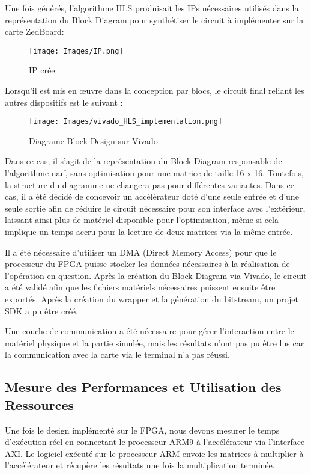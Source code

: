 \documentclass[../CSC_5RO06_TA.tex]{subfiles}
\begin{document}
Une fois générés, l'algorithme HLS produisait les IPs nécessaires utilisés dans la représentation du Block Diagram pour synthétiser le circuit à implémenter sur la carte ZedBoard:

\begin{figure}[H]
    \centering
    \texttt{[image: Images/IP.png]}
    \caption{IP crée}
\end{figure}

Lorsqu'il est mis en œuvre dans la conception par blocs, le circuit final reliant les autres dispositifs est le suivant :


\begin{figure}[H]
    \centering
    \texttt{[image: Images/vivado\_HLS\_implementation.png]}
    \caption{Diagrame Block Design sur Vivado}
\end{figure}

Dans ce cas, il s'agit de la représentation du Block Diagram responsable de l'algorithme naïf, sans optimisation pour une matrice de taille 16 x 16. Toutefois, la structure du diagramme ne changera pas pour différentes variantes. Dans ce cas, il a été décidé de concevoir un accélérateur doté d'une seule entrée et d'une seule sortie afin de réduire le circuit nécessaire pour son interface avec l'extérieur, laissant ainsi plus de matériel disponible pour l'optimisation, même si cela implique un temps accru pour la lecture de deux matrices via la même entrée.

Il a été nécessaire d'utiliser un DMA (Direct Memory Access) pour que le processeur du FPGA puisse stocker les données nécessaires à la réalisation de l'opération en question. Après la création du Block Diagram via Vivado, le circuit a été validé afin que les fichiers matériels nécessaires puissent ensuite être exportés. Après la création du wrapper et la génération du bitstream, un projet SDK a pu être créé.

Une couche de communication a été nécessaire pour gérer l'interaction entre le matériel physique et la partie simulée, mais les résultats n'ont pas pu être lus car la communication avec la carte via le terminal n'a pas réussi.

\subsection{Mesure des Performances et Utilisation des Ressources}

Une fois le design implémenté sur le FPGA, nous devons mesurer le temps d'exécution réel en connectant le processeur ARM9 à l'accélérateur via l'interface AXI. Le logiciel exécuté sur le processeur ARM envoie les matrices à multiplier à l'accélérateur et récupère les résultats une fois la multiplication terminée.
\end{document}
